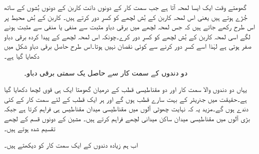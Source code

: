 گھومتے وقت ایک ایسا لمحہ آتا ہے جب سمت کار کے دونوں دانت کاربن کے دونوں بُشوں کے ساتھ جُڑے ہوتے ہیں یعنی اس لمحہ کاربن کے بُش لچھے کو کسرِ دور کرتے ہیں۔ کاربن کے بُش محیط پر اس طرح رکھے جاتے ہیں کہ جس لمحہ لچھے میں برقی دباو مثبت سے منفی یا منفی سے مثبت ہونے لگے اسی لمحہ کاربن کے بُش لچھے کو کسرِ دور کرے۔چونکہ اس لمحہ لچھے کے پیدا کردہ برقی دباو صفر ہوتی ہے لہٰذا اسے کسرِ دور کرنے سے کوئی نقصان نہیں ہوتا۔اس طرح حاصل برقی دباو شکل   میں دکھایا گیا ہے۔
\begin{figure}
\centering
\caption{دو دندوں کے سمت کار سے حاصل یک سمتی برقی دباو۔}
\label{شکل_یکسمتی_دو_دندوں_کا_سمتکار}
\end{figure}


یہاں دو دندوں والا سمت کار اور دو مقناطیسی قطب کے درمیان گھومتا ایک ہی قوی لچھا دکھایا گیا ہے۔حقیقت میں جنریٹر کے بہت سارے قطب ہوں گے اور ہر ایک قطب کے لئے سمت کار کے کئی دندے ہوں گے۔مزید یہ کہ نہایت چھوٹی آلوں میں مقناطیسی میدان مقناطیس ہی فراہم کرتا ہے جبکہ بڑی آلوں میں مقناطیسی میدان ساکن میدانی لچھے فراہم کرتے ہیں۔ مشین کے دونوں قسم کے لچھے تقسیم شدہ ہوتے ہیں۔

اب ہم زیادہ دندوں کے ایک سمت کار کو دیکھتے ہیں۔

